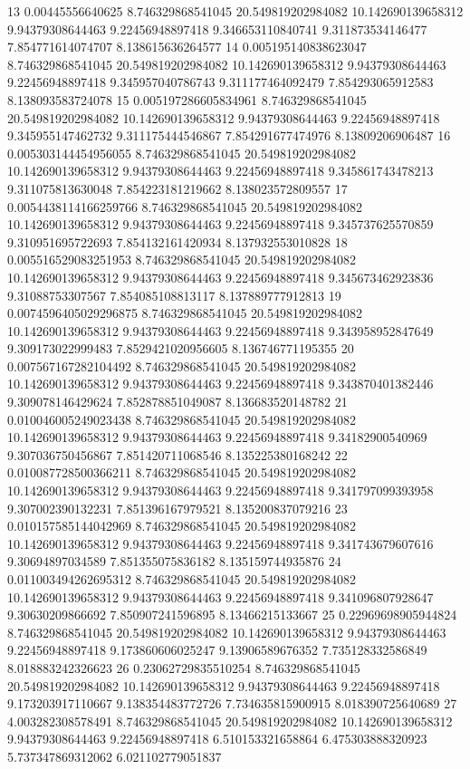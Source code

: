 {13 0.00445556640625 8.746329868541045 20.549819202984082 10.142690139658312 9.94379308644463 9.22456948897418 9.346653110840741 9.311873534146477 7.854771614074707 8.138615636264577
14 0.005195140838623047 8.746329868541045 20.549819202984082 10.142690139658312 9.94379308644463 9.22456948897418 9.345957040786743 9.311177464092479 7.854293065912583 8.138093583724078
15 0.005197286605834961 8.746329868541045 20.549819202984082 10.142690139658312 9.94379308644463 9.22456948897418 9.345955147462732 9.311175444546867 7.854291677474976 8.13809206906487
16 0.005303144454956055 8.746329868541045 20.549819202984082 10.142690139658312 9.94379308644463 9.22456948897418 9.345861743478213 9.311075813630048 7.854223181219662 8.138023572809557
17 0.0054438114166259766 8.746329868541045 20.549819202984082 10.142690139658312 9.94379308644463 9.22456948897418 9.345737625570859 9.310951695722693 7.854132161420934 8.137932553010828
18 0.005516529083251953 8.746329868541045 20.549819202984082 10.142690139658312 9.94379308644463 9.22456948897418 9.345673462923836 9.31088753307567 7.854085108813117 8.137889777912813
19 0.0074596405029296875 8.746329868541045 20.549819202984082 10.142690139658312 9.94379308644463 9.22456948897418 9.343958952847649 9.309173022999483 7.8529421020956605 8.136746771195355
20 0.007567167282104492 8.746329868541045 20.549819202984082 10.142690139658312 9.94379308644463 9.22456948897418 9.343870401382446 9.309078146429624 7.852878851049087 8.136683520148782
21 0.010046005249023438 8.746329868541045 20.549819202984082 10.142690139658312 9.94379308644463 9.22456948897418 9.34182900540969 9.307036750456867 7.851420711068546 8.135225380168242
22 0.010087728500366211 8.746329868541045 20.549819202984082 10.142690139658312 9.94379308644463 9.22456948897418 9.341797099393958 9.307002390132231 7.851396167979521 8.135200837079216
23 0.010157585144042969 8.746329868541045 20.549819202984082 10.142690139658312 9.94379308644463 9.22456948897418 9.341743679607616 9.30694897034589 7.851355075836182 8.135159744935876
24 0.011003494262695312 8.746329868541045 20.549819202984082 10.142690139658312 9.94379308644463 9.22456948897418 9.341096807928647 9.30630209866692 7.850907241596895 8.13466215133667
25 0.22969698905944824 8.746329868541045 20.549819202984082 10.142690139658312 9.94379308644463 9.22456948897418 9.173860606025247 9.13906589676352 7.735128332586849 8.018883242326623
26 0.23062729835510254 8.746329868541045 20.549819202984082 10.142690139658312 9.94379308644463 9.22456948897418 9.173203917110667 9.138354483772726 7.734635815900915 8.018390725640689
27 4.003282308578491 8.746329868541045 20.549819202984082 10.142690139658312 9.94379308644463 9.22456948897418 6.510153321658864 6.475303888320923 5.737347869312062 6.021102779051837
}

